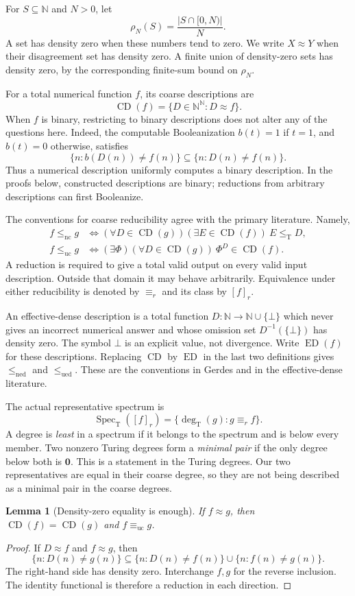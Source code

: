 \documentclass[11pt,a4paper]{article}
\newcommand{\N}{\mathbb N}
\newcommand{\Baire}{\N^{\N}}
\newcommand{\leT}{\leq_{\mathrm T}}
\newcommand{\degT}{\operatorname{deg}_{\mathrm T}}
\newcommand{\Spec}{\operatorname{Spec}_{\mathrm T}}
\newcommand{\CD}{\operatorname{CD}}
\newcommand{\ED}{\operatorname{ED}}
\newcommand{\nc}{\mathrm{nc}}
\newcommand{\uc}{\mathrm{uc}}
\newcommand{\ned}{\mathrm{ned}}
\newcommand{\ued}{\mathrm{ued}}
\newcommand{\zero}{\mathbf 0}
\newtheorem{lemma}[theorem]{Lemma}
\theoremstyle{definition}\newtheorem{definition}[theorem]{Definition}
\theoremstyle{remark}\newtheorem{remark}[theorem]{Remark}
\begin{document}
For $S\subseteq\N$ and $N>0$, let
\[
 \rho_N(S)=\frac{|S\cap[0,N)|}{N}.
\]
A set has density zero when these numbers tend to zero. We write $X\approx Y$ when their disagreement set has density zero. A finite union of density-zero sets has density zero, by the corresponding finite-sum bound on $\rho_N$.

For a total numerical function $f$, its coarse descriptions are
\[
 \CD(f)=\{D\in\Baire:D\approx f\}.
\]
When $f$ is binary, restricting to binary descriptions does not alter any of the questions here. Indeed, the computable Booleanization $b(t)=1$ if $t=1$, and $b(t)=0$ otherwise, satisfies
\[
 \{n:b(D(n))\ne f(n)\}\subseteq\{n:D(n)\ne f(n)\}.
\]
Thus a numerical description uniformly computes a binary description. In the proofs below, constructed descriptions are binary; reductions from arbitrary descriptions can first Booleanize.

The conventions for coarse reducibility agree with the primary literature.\cite[Definitions~1.2--1.3]{HJKS} Namely,
\begin{align*}
 f\leq_\nc g
 &\iff (\forall D\in\CD(g))(\exists E\in\CD(f))\ E\leT D,\\
 f\leq_\uc g
 &\iff (\exists\Phi)(\forall D\in\CD(g))\ \Phi^D\in\CD(f).
\end{align*}
A reduction is required to give a total valid output on every valid input description. Outside that domain it may behave arbitrarily. Equivalence under either reducibility is denoted by $\equiv_r$ and its class by $[f]_r$.

An effective-dense description is a total function $D:\N\to\N\cup\{\bot\}$ which never gives an incorrect numerical answer and whose omission set $D^{-1}(\{\bot\})$ has density zero. The symbol $\bot$ is an explicit value, not divergence. Write $\ED(f)$ for these descriptions. Replacing $\CD$ by $\ED$ in the last two definitions gives $\leq_\ned$ and $\leq_\ued$. These are the conventions in Gerdes and in the effective-dense literature.\cite{Gerdes,AHJ}

The actual representative spectrum is
\[
 \Spec([f]_r)=\{\degT(g):g\equiv_r f\}.
\]
A degree is \emph{least} in a spectrum if it belongs to the spectrum and is below every member. Two nonzero Turing degrees form a \emph{minimal pair} if the only degree below both is $\zero$. This is a statement in the Turing degrees. Our two representatives are equal in their coarse degree, so they are not being described as a minimal pair in the coarse degrees.

\begin{lemma}[Density-zero equality is enough]\label{lem:identity}
If $f\approx g$, then $\CD(f)=\CD(g)$ and $f\equiv_\uc g$.
\end{lemma}
\begin{proof}
If $D\approx f$ and $f\approx g$, then
\[
 \{n:D(n)\ne g(n)\}\subseteq
 \{n:D(n)\ne f(n)\}\cup\{n:f(n)\ne g(n)\}.
\]
The right-hand side has density zero. Interchange $f,g$ for the reverse inclusion. The identity functional is therefore a reduction in each direction.
\end{proof}
\end{document}
